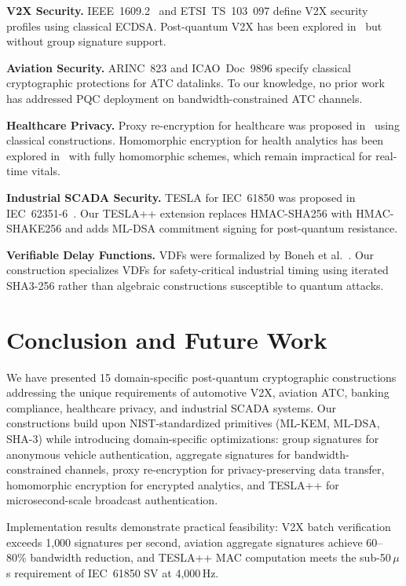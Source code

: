 \documentclass[conference,10pt]{IEEEtran}
\newcommand{\mldsa}{\textsf{ML-DSA}}
\newcommand{\shake}{\textsf{SHAKE256}}
\newcommand{\shaiii}{\textsf{SHA3-256}}
\begin{document}
\textbf{V2X Security.} IEEE~1609.2~\cite{ieee16092} and ETSI~TS~103~097 define V2X security profiles using classical ECDSA. Post-quantum V2X has been explored in~\cite{pq_v2x_survey} but without group signature support.

\textbf{Aviation Security.} ARINC~823 and ICAO~Doc~9896 specify classical cryptographic protections for ATC datalinks. To our knowledge, no prior work has addressed PQC deployment on bandwidth-constrained ATC channels.

\textbf{Healthcare Privacy.} Proxy re-encryption for healthcare was proposed in~\cite{pre_healthcare} using classical constructions. Homomorphic encryption for health analytics has been explored in~\cite{he_health} with fully homomorphic schemes, which remain impractical for real-time vitals.

\textbf{Industrial SCADA Security.} TESLA for IEC~61850 was proposed in IEC~62351-6~\cite{iec62351}. Our TESLA++ extension replaces HMAC-SHA256 with HMAC-\shake{} and adds \mldsa{} commitment signing for post-quantum resistance.

\textbf{Verifiable Delay Functions.} VDFs were formalized by Boneh et al.~\cite{boneh_vdf}. Our construction specializes VDFs for safety-critical industrial timing using iterated \shaiii{} rather than algebraic constructions susceptible to quantum attacks.

\section{Conclusion and Future Work}
\label{sec:conclusion}

We have presented 15 domain-specific post-quantum cryptographic constructions addressing the unique requirements of automotive V2X, aviation ATC, banking compliance, healthcare privacy, and industrial SCADA systems. Our constructions build upon NIST-standardized primitives (ML-KEM, ML-DSA, SHA-3) while introducing domain-specific optimizations: group signatures for anonymous vehicle authentication, aggregate signatures for bandwidth-constrained channels, proxy re-encryption for privacy-preserving data transfer, homomorphic encryption for encrypted analytics, and TESLA++ for microsecond-scale broadcast authentication.

Implementation results demonstrate practical feasibility: V2X batch verification exceeds 1{,}000 signatures per second, aviation aggregate signatures achieve 60--80\% bandwidth reduction, and TESLA++ MAC computation meets the sub-50\,$\mu$s requirement of IEC~61850 SV at 4{,}000\,Hz.
\end{document}

